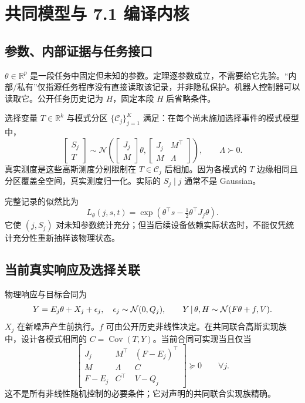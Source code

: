 \documentclass[UTF8,fontset=fandol,11pt,a4paper]{ctexart}
\newcommand{\R}{\mathbb R}\newcommand{\N}{\mathcal N}\newcommand{\E}{\mathbb E}
\DeclareMathOperator{\Cov}{Cov}\DeclareMathOperator{\im}{im}\DeclareMathOperator{\rank}{rank}
\theoremstyle{definition}\newtheorem{definition}[theorem]{定义}\newtheorem{assumption}[theorem]{条件}
\numberwithin{equation}{section}
\begin{document}
\section{共同模型与 7.1 编译内核}
\label{sec:core}
\subsection{参数、内部证据与任务接口}
$\theta\in\R^p$ 是一段任务中固定但未知的参数。定理逐参数成立，不需要给它先验。“内部/私有”仅指源任务程序没有直接读取该记录，并非隐私保护。机器人控制器可以读取它。公开任务历史记为 $H$，固定本段 $H$ 后省略条件。

选择变量 $T\in\R^k$ 与模式分区 $\{\mathcal C_j\}_{j=1}^K$ 满足：在每个尚未施加选择事件的模式模型中，
\begin{equation}
\begin{bmatrix}S_j\\T\end{bmatrix}
\sim\N\!\left(\begin{bmatrix}J_j\\M\end{bmatrix}\theta,
\begin{bmatrix}J_j&M^\top\\M&\Lambda\end{bmatrix}\right),
\qquad \Lambda\succ0.
\label{eq:base}
\end{equation}
真实测度是这些高斯测度分别限制在 $T\in\mathcal C_j$ 后相加。因为各模式的 $T$ 边缘相同且分区覆盖全空间，真实测度归一化。实际的 $S_j\mid j$ 通常不是 Gaussian。

完整记录的似然比为
\begin{equation}
L_\theta(j,s,t)
=\exp\!\left(\theta^\top s-\tfrac12\theta^\top J_j\theta\right).
\label{eq:lr}
\end{equation}
它使 $(j,S_j)$ 对未知参数统计充分；但当后续设备依赖实际状态时，不能仅凭统计充分性重新抽样该物理状态。

\subsection{当前真实响应及选择关联}
物理响应与目标合同为
\begin{equation}
Y=E_j\theta+X_j+\epsilon_j,\quad \epsilon_j\sim\N(0,Q_j),
\qquad Y\given\theta,H\sim\N(F\theta+f,V).
\label{eq:physicalbase}
\end{equation}
$X_j$ 在新噪声产生前执行。$f$ 可由公开历史非线性决定。在共同联合高斯实现族中，设计各模式相同的 $C=\Cov(T,Y)$。当前合同可实现当且仅当
\begin{equation}
\begin{bmatrix}
J_j&M^\top&(F-E_j)^\top\\
M&\Lambda&C\\
F-E_j&C^\top&V-Q_j
\end{bmatrix}\succeq0\qquad\forall j.
\label{eq:basegate}
\end{equation}
这不是所有非线性随机控制的必要条件；它对声明的共同联合实现族精确。
\end{document}
